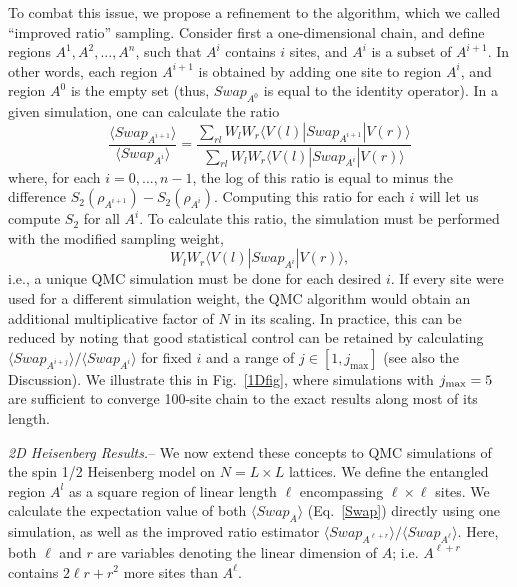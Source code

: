 \documentclass[prl,aps,twocolumn,floatfix,amsmath,amssymb,superscriptaddress,tightenlines]{revtex4}
\begin{document}
To combat this issue, we propose a refinement to the algorithm, which we called ``improved ratio'' sampling.
Consider first a one-dimensional chain, and define regions $A^1,A^2,...,A^n$, such
that $A^i$ contains $i$ sites, and $A^i$ is a subset of $A^{i+1}$.  In other words, each region $A^{i+1}$ is obtained by adding one site to region
$A^{i}$, and region $A^0$ is the empty set (thus, $Swap_{A^0}$ is equal to the identity operator).
In a given simulation, one can calculate the ratio
\begin{equation}
\frac{\langle Swap_{A^{i+1}}\rangle}{\langle Swap_{A^{i}}\rangle}
= \frac{\sum_{rl} W_l W_r \langle V(l) | Swap_{A^{i+1}} | V(r) \rangle} {\sum_{rl} W_l W_r \langle V(l) | Swap_{A^i} | V(r) \rangle}
\label{Ratio}
\end{equation}
where, for each $i=0,...,n-1$, the log of this ratio is equal to minus the difference $S_2(\rho_{A^{i+1}})-S_2(\rho_{A^{i}})$.
Computing this ratio for each $i$ will let us compute $S_2$ for all $A^i$.  To calculate this ratio, the simulation must be performed 
with the modified sampling weight,
\begin{equation}
W_l W_r \langle V(l) | Swap_{A^i} | V(r) \rangle,
\end{equation}
i.e., a unique QMC simulation must be done for each desired $i$.  %
If every site were used for a different simulation weight, the QMC algorithm would obtain an additional multiplicative factor of $N$ in its scaling.
In practice, 
this can be reduced by noting that good statistical control can be retained by calculating 
${\langle Swap_{A^{i+j}}\rangle}/{\langle Swap_{A^{i}}\rangle}$ for fixed $i$ and a range of $j \in [1,j_{\max}]$ (see also the Discussion).  We illustrate this in Fig.~\ref{1Dfig},
where simulations with $j_{\rm max}=5$ are sufficient to converge 100-site chain to the exact results along most of its length.

{\it 2D Heisenberg Results.}-- We now extend these concepts to QMC simulations of the spin 1/2 Heisenberg model on $N=L \times L$ lattices.  We define the entangled region $A^l$ as a square region of linear length $\ell$ encompassing $\ell \times \ell$ sites.  We calculate the expectation value of both $\langle Swap_A \rangle$ (Eq.~\ref{Swap}) directly using one simulation, as well as the improved ratio estimator ${\langle Swap_{A^{\ell+r}}\rangle}/{\langle Swap_{A^{\ell}}\rangle}$.  Here, both $\ell$ and $r$ are variables denoting the linear dimension of $A$; i.e. $A^{\ell+r}$ contains $2\ell r+r^2$ more sites than $A^{\ell}$.
\end{document}
